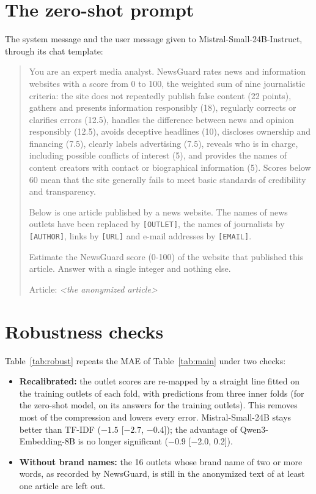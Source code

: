 \documentclass[11pt,a4paper]{article}
\begin{document}
\section{The zero-shot prompt}\label{app:prompt}
The system message and the user message given to Mistral-Small-24B-Instruct, through its chat template:

\begin{quote}\small
You are an expert media analyst. NewsGuard rates news and information websites with a score from 0 to 100, the weighted
sum of nine journalistic criteria: the site does not repeatedly publish false content (22 points), gathers and presents
information responsibly (18), regularly corrects or clarifies errors (12.5), handles the difference between news and
opinion responsibly (12.5), avoids deceptive headlines (10), discloses ownership and financing (7.5), clearly labels
advertising (7.5), reveals who is in charge, including possible conflicts of interest (5), and provides the names of
content creators with contact or biographical information (5). Scores below 60 mean that the site generally fails to
meet basic standards of credibility and transparency.

\smallskip\noindent Below is one article published by a news website. The names of news outlets have been replaced by \texttt{[OUTLET]}, the names of journalists by \texttt{[AUTHOR]}, links by \texttt{[URL]} and e-mail addresses by \texttt{[EMAIL]}.

\smallskip\noindent Estimate the NewsGuard score (0-100) of the website that published this article. Answer with a single integer and nothing else.

\smallskip\noindent Article:
\emph{<the anonymized article>}
\end{quote}


\section{Robustness checks}\label{app:robust}
Table~\ref{tab:robust} repeats the MAE of Table~\ref{tab:main} under two checks:
\begin{itemize}
  \item \textbf{Recalibrated:} the outlet scores are re-mapped by a straight line fitted on the training outlets of each
        fold, with predictions from three inner folds (for the zero-shot model, on its answers for the training
        outlets). This removes most of the compression and lowers every error. Mistral-Small-24B stays better than
        TF-IDF ($-1.5$ [$-2.7$, $-0.4$]); the advantage of Qwen3-Embedding-8B is no longer significant ($-0.9$ [$-2.0$,
        0.2]).
  \item \textbf{Without brand names:} the 16 outlets whose brand name of two or more words, as recorded by NewsGuard, is
        still in the anonymized text of at least one article are left out.
\end{itemize}
\end{document}
